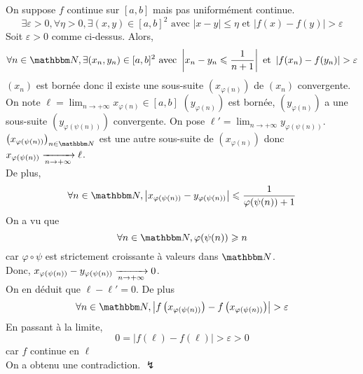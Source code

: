 \begin{prv}
	On suppose $f$ continue sur $[a,b]$ mais pas uniformément continue. \[
		\exists \varepsilon > 0, \forall \eta > 0, \exists (x,y) \in [a,b]^2 \text{ avec } \left| x-y \right| \le  \eta \text{ et } \left| f(x) - f(y) \right| > \varepsilon
	\] Soit $\varepsilon>0$ comme ci-dessus. Alors, \[
		\forall n \in \N, \exists (x_n,y_n) \in [a,b]^2 \text{ avec } \left| x_n-y_n \le \frac{1}{n+1} \right| \text{ et } \left| f(x_n) - f(y_n) \right| >\varepsilon
	\]
	$(x_n)$ est bornée donc il existe une sous-suite $\left( x_{\varphi(n)} \right)$ de $(x_n)$ convergente. On note $\ell = \lim_{n\to +\infty}x_{\varphi(n)} \in [a,b]$
	$\left( y_{\varphi(n)} \right)$ est bornée, $\left( y_{\varphi(n)} \right)$ a une sous-suite $\left( y_{\varphi(\psi(n))} \right)$ convergente. On pose $\ell' = \lim_{n \to +\infty} y_{\varphi(\psi(n))}$. $\left( x_{\varphi(\psi(n))} \right)_{n\in \N}$ est une autre sous-suite de $\left( x_{\varphi(n)} \right)$ donc $x_{\varphi(\psi(n))} \xrightarrow[n \to +\infty]{} \ell$.\\
	De plus, \[
		\forall n \in \N, \left| x_{\varphi(\psi(n))} - y_{\varphi(\psi(n))} \right| \le \frac{1}{\varphi(\psi(n))+1}
	\] On a vu que \[
		\forall n \in \N, \varphi(\psi(n)) \ge n
	\] car $\varphi \circ \psi$ est strictement croissante à valeurs dans $\N$.\\
	Donc, $x_{\varphi(\psi(n))} - y_{\varphi(\psi(n))} \xrightarrow[n \to +\infty]{} 0$.\\
	On en déduit que $\ell - \ell' = 0$. De plus \[
		\forall n \in \N, \left| f\left(x_{\varphi(\psi(n))}\right) - f\left( x_{\varphi(\psi(n))} \right)  \right| > \varepsilon
	\] En passant à la limite, \[
		0 = \left| f(\ell) - f(\ell) \right| > \varepsilon > 0
	\] car $f$ continue en $\ell$\\
	On a obtenu une contradiction. $\lightning$
\end{prv}

